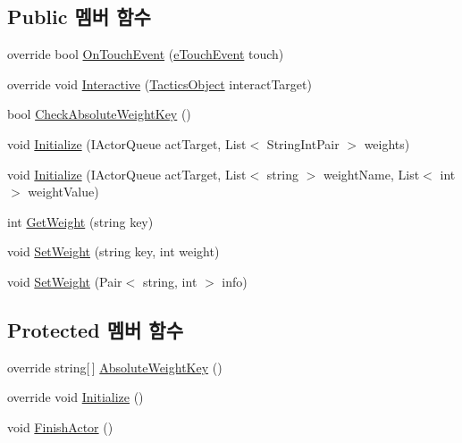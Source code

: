 \subsection*{Public 멤버 함수}
\begin{DoxyCompactItemize}
\item 
override bool \hyperlink{class_attack_actor_a471c22dd21a49e9676a0e9d276cba709}{On\+Touch\+Event} (\hyperlink{_touch_manager_8cs_ae33e321a424fe84ba8b2fdb81ad40a68}{e\+Touch\+Event} touch)
\item 
override void \hyperlink{class_attack_actor_a766e164877bf499175dfb091967198a5}{Interactive} (\hyperlink{class_tactics_object}{Tactics\+Object} interact\+Target)
\item 
bool \hyperlink{class_m_c_n_1_1_actor_a493bb0a37cb9fc5b1aa8507ec69b04ac}{Check\+Absolute\+Weight\+Key} ()
\item 
void \hyperlink{class_m_c_n_1_1_actor_a27b307fecbbbf3aa53f8b5683de7ff36}{Initialize} (I\+Actor\+Queue act\+Target, List$<$ String\+Int\+Pair $>$ weights)
\item 
void \hyperlink{class_m_c_n_1_1_actor_ae5856541ad65c2c0ecc055414d20df0f}{Initialize} (I\+Actor\+Queue act\+Target, List$<$ string $>$ weight\+Name, List$<$ int $>$ weight\+Value)
\item 
int \hyperlink{class_m_c_n_1_1_actor_af264703ef93c3c77b5b7062aef828205}{Get\+Weight} (string key)
\item 
void \hyperlink{class_m_c_n_1_1_actor_a8d8020782aefa7fff625f5f8e09f7539}{Set\+Weight} (string key, int weight)
\item 
void \hyperlink{class_m_c_n_1_1_actor_a4337ef4d88c2086f18db4f2e6415eddd}{Set\+Weight} (Pair$<$ string, int $>$ info)
\end{DoxyCompactItemize}
\subsection*{Protected 멤버 함수}
\begin{DoxyCompactItemize}
\item 
override string\mbox{[}$\,$\mbox{]} \hyperlink{class_attack_actor_af120af42f4607f14a61928429f84eba5}{Absolute\+Weight\+Key} ()
\item 
override void \hyperlink{class_attack_actor_a6ecde7d8728f53eb75e5f5547deeec8e}{Initialize} ()
\item 
void \hyperlink{class_m_c_n_1_1_actor_ae86279ca7d290707cd010bc411f38966}{Finish\+Actor} ()
\end{DoxyCompactItemize}
